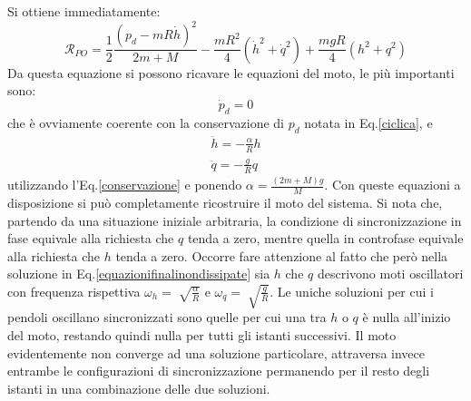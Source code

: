 \documentclass[11pt, a4paper, twoside]{article}
\begin{document}
Si ottiene immediatamente:
\begin{equation*}
  \mathcal{R}_{PO} = \frac{1}{2} \frac{(p_d -mR\dot h)^2}{2m + M}- \frac{mR^2}{4}  (\dot{h}^2 + \dot{q}^2) + \frac{mgR}{4}(h^2 + q^2)
\end{equation*}
Da questa equazione si possono ricavare le equazioni del moto, le più importanti sono:
\begin{equation}
  \dot p_d = 0
  \label{conservazione}
\end{equation}
che è ovviamente coerente con la conservazione di $p_d$ notata in Eq.\ref{ciclica}, e
\begin{equation}
  \begin{split}
  \ddot h = -\frac{\alpha}{R} h \\
  \ddot q = - \frac{g}{R} q
  \end{split}
  \label{equazionifinalinondissipate}
\end{equation}
utilizzando l'Eq.\ref{conservazione} e ponendo $\alpha = \frac{(2m + M) g}{M} $.
Con queste equazioni a disposizione si può completamente ricostruire il moto del sistema.
Si nota che, partendo da una situazione iniziale arbitraria,
la condizione di sincronizzazione in fase equivale alla richiesta che $q$ tenda a zero, mentre quella in controfase
equivale alla richiesta che $h$ tenda a zero. 
Occorre fare attenzione al fatto che però nella soluzione in Eq.\ref{equazionifinalinondissipate} sia $h$ che $q$ descrivono moti oscillatori con frequenza rispettiva
$\omega_h = \sqrt[]{\frac{\alpha}{R}}$ e $\omega_q = \sqrt[]{\frac{g}{R}}$.
Le uniche soluzioni per cui i pendoli oscillano sincronizzati sono quelle per cui una tra $h$ o $q$ è nulla
all'inizio del moto, restando quindi nulla per tutti gli istanti successivi.
Il moto evidentemente non converge ad una soluzione particolare, attraversa invece entrambe le configurazioni di sincronizzazione 
permanendo per il resto degli istanti in una combinazione delle due soluzioni.
\label{sezionesenzaattrito}
\end{document}
